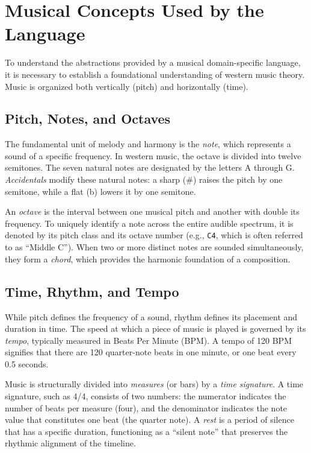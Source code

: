 \section{Musical Concepts Used by the Language}\label{sec:music-theory-primer}

To understand the abstractions provided by a musical domain-specific language, it is necessary to establish a
foundational understanding of western music theory.
Music is organized both vertically (pitch) and horizontally (time).

\subsection{Pitch, Notes, and Octaves}\label{detail-subsec:pitch-notes-and-octaves}

The fundamental unit of melody and harmony is the \textit{note}, which represents a sound of a specific frequency.
In western music, the octave is divided into twelve semitones.
The seven natural notes are designated by the letters A through G\@.
\textit{Accidentals} modify these natural notes: a sharp (\#) raises the pitch by one semitone, while a flat (b) lowers
it by one semitone.

An \textit{octave} is the interval between one musical pitch and another with double its frequency.
To uniquely identify a note across the entire audible spectrum, it is denoted by its pitch class and its octave number
(e.g., \texttt{C4}, which is often referred to as ``Middle C'').
When two or more distinct notes are sounded simultaneously, they form a \textit{chord}, which provides the harmonic
foundation of a composition.

\subsection{Time, Rhythm, and Tempo}\label{detail-subsec:time-rhythm-and-tempo}

While pitch defines the frequency of a sound, rhythm defines its placement and duration in time.
The speed at which a piece of music is played is governed by its \textit{tempo}, typically measured in Beats Per Minute
(BPM).
A tempo of 120 BPM signifies that there are 120 quarter-note beats in one minute, or one beat every 0.5 seconds.

Music is structurally divided into \textit{measures} (or bars) by a \textit{time signature}.
A time signature, such as 4/4, consists of two numbers: the numerator indicates the number of beats per measure (four),
and the denominator indicates the note value that constitutes one beat (the quarter note).
A \textit{rest} is a period of silence that has a specific duration, functioning as a ``silent note'' that preserves the
rhythmic alignment of the timeline.
